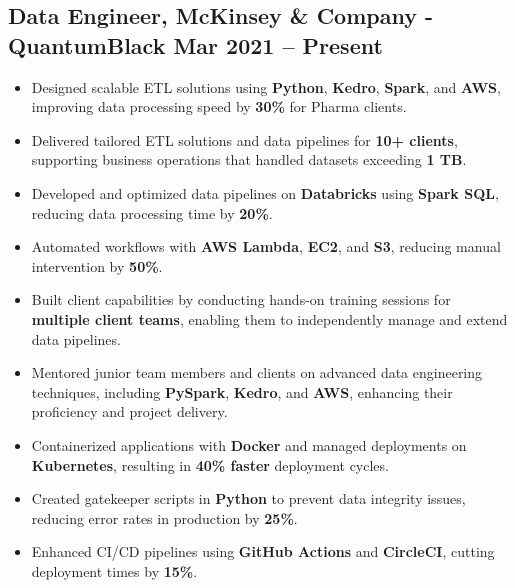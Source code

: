 \documentclass[a4paper,10pt]{article}
\begin{document}
\subsection*{Data Engineer, McKinsey \& Company - QuantumBlack \hfill Mar 2021 -- Present}
\begin{itemize}
    \item Designed scalable ETL solutions using \textbf{Python}, \textbf{Kedro}, \textbf{Spark}, and \textbf{AWS}, improving data processing speed by \textbf{30\%} for Pharma clients.
    \item Delivered tailored ETL solutions and data pipelines for \textbf{10+ clients}, supporting business operations that handled datasets exceeding \textbf{1 TB}.
    \item Developed and optimized data pipelines on \textbf{Databricks} using \textbf{Spark SQL}, reducing data processing time by \textbf{20\%}.
    \item Automated workflows with \textbf{AWS Lambda}, \textbf{EC2}, and \textbf{S3}, reducing manual intervention by \textbf{50\%}.
    \item Built client capabilities by conducting hands-on training sessions for \textbf{multiple client teams}, enabling them to independently manage and extend data pipelines.
    \item Mentored junior team members and clients on advanced data engineering techniques, including \textbf{PySpark}, \textbf{Kedro}, and \textbf{AWS}, enhancing their proficiency and project delivery.
    \item Containerized applications with \textbf{Docker} and managed deployments on \textbf{Kubernetes}, resulting in \textbf{40\% faster} deployment cycles.
    \item Created gatekeeper scripts in \textbf{Python} to prevent data integrity issues, reducing error rates in production by \textbf{25\%}.
    \item Enhanced CI/CD pipelines using \textbf{GitHub Actions} and \textbf{CircleCI}, cutting deployment times by \textbf{15\%}.
\end{itemize}
\end{document}
